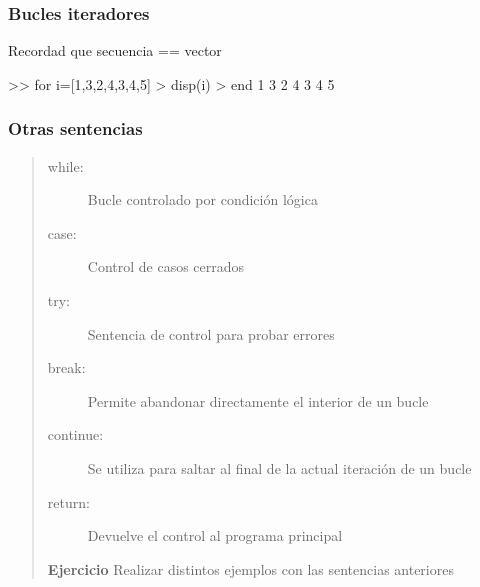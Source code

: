 
\hypertarget{bucles-iteradores}{}
\begin{frame}[containsverbatim]
\frametitle{Bucles iteradores}

Recordad que secuencia == vector
\begin{Octave}
>> for i=[1,3,2,4,3,4,5] 
> disp(i) 
> end 
 1 
 3 
 2 
 4 
 3 
 4 
 5
\end{Octave}

\end{frame}


\hypertarget{otras-sentencias}{}
\begin{frame}\frametitle{Otras sentencias}
\begin{quote}
\begin{description}

\item [while:]
Bucle controlado por condición lógica

\item [case:]
Control de casos cerrados

\item [try:]
Sentencia de control para probar errores

\item [break:]
Permite abandonar directamente el interior de un bucle


\item [continue:]
Se utiliza para saltar al final de la actual iteración de un bucle


\item [return:]
Devuelve el control al programa principal

\end{description}
\vfill
\textbf{Ejercicio} Realizar distintos ejemplos con las
sentencias anteriores
\end{quote}

\end{frame}





